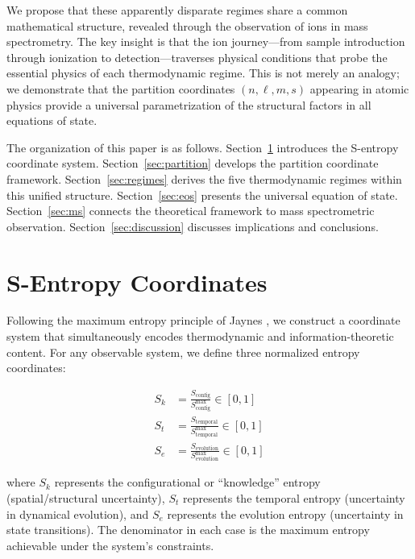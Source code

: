 \documentclass[twocolumn,aps,prd,superscriptaddress,nofootinbib]{revtex4-2}
\newcommand{\Sk}{S_k}
\newcommand{\St}{S_t}
\newcommand{\Se}{S_e}
\begin{document}
We propose that these apparently disparate regimes share a common mathematical structure, revealed through the observation of ions in mass spectrometry. The key insight is that the ion journey---from sample introduction through ionization to detection---traverses physical conditions that probe the essential physics of each thermodynamic regime. This is not merely an analogy; we demonstrate that the partition coordinates $(n, \ell, m, s)$ appearing in atomic physics provide a universal parametrization of the structural factors in all equations of state.

The organization of this paper is as follows. Section~\ref{sec:s-entropy} introduces the S-entropy coordinate system. Section~\ref{sec:partition} develops the partition coordinate framework. Section~\ref{sec:regimes} derives the five thermodynamic regimes within this unified structure. Section~\ref{sec:eos} presents the universal equation of state. Section~\ref{sec:ms} connects the theoretical framework to mass spectrometric observation. Section~\ref{sec:discussion} discusses implications and conclusions.

\section{S-Entropy Coordinates}
\label{sec:s-entropy}

Following the maximum entropy principle of Jaynes \cite{jaynes1957information}, we construct a coordinate system that simultaneously encodes thermodynamic and information-theoretic content. For any observable system, we define three normalized entropy coordinates:

\begin{align}
\Sk &= \frac{S_{\text{config}}}{S_{\text{config}}^{\max}} \in [0,1] \label{eq:Sk}\\
\St &= \frac{S_{\text{temporal}}}{S_{\text{temporal}}^{\max}} \in [0,1] \label{eq:St}\\
\Se &= \frac{S_{\text{evolution}}}{S_{\text{evolution}}^{\max}} \in [0,1] \label{eq:Se}
\end{align}

\noindent where $\Sk$ represents the configurational or ``knowledge'' entropy (spatial/structural uncertainty), $\St$ represents the temporal entropy (uncertainty in dynamical evolution), and $\Se$ represents the evolution entropy (uncertainty in state transitions). The denominator in each case is the maximum entropy achievable under the system's constraints.
\end{document}
